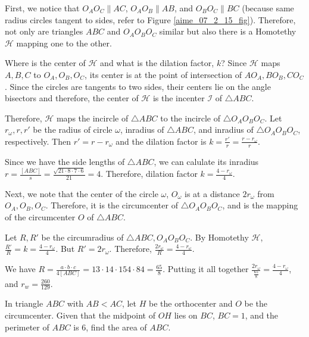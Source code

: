 \documentclass[11pt,twoside]{scrartcl}
\begin{document}
\begin{soln}
    First, we notice that $O_AO_C \parallel AC$, $O_AO_B \parallel AB$, and $O_BO_C \parallel BC$ (because same radius circles tangent to sides, refer to Figure \ref{aime_07_2_15_fig}). Therefore, not only are triangles $ABC$ and $O_AO_BO_C$ similar but also there is a Homotethy $\mathcal{H}$ mapping one to the other. 

    Where is the center of $\mathcal{H}$ and what is the dilation factor, $k$? Since $\mathcal{H}$ maps $A, B, C$ to $O_A, O_B, O_C$, its center is at the point of intersection of $AO_A, BO_B, CO_C$. Since the circles are tangents to two sides, their centers lie on the angle bisectors and therefore, the center of $\mathcal{H}$ is the incenter $\mathcal{I}$ of $\triangle ABC$.

    Therefore, $\mathcal{H}$ maps the incircle of $\triangle ABC$ to the incircle of $\triangle O_AO_BO_C$. Let $r_\omega, r, r'$ be the radius of circle $\omega$, inradius of $\triangle ABC$, and inradius of $\triangle O_AO_BO_C$, respectively. Then $r' = r - r_\omega$ and the dilation factor is $k = \frac{r'}{r} = \frac{r - r_\omega}{r}$.

    Since we have the side lengths of $\triangle{ABC}$, we can calulate its inradius $r = \frac{[ABC]}{s} = \frac{\sqrt{21\cdot8\cdot7\cdot6}}{21} = 4$. Therefore, dilation factor $k = \frac{4-r_\omega}{4}$.

    Next, we note that the center of the circle $\omega$, $O_\omega$ is at a distance $2r_\omega$ from $O_A, O_B, O_C$. Therefore, it is the circumcenter of $\triangle O_AO_BO_C$, and is the mapping of the circumcenter $O$ of $\triangle ABC$.

    Let $R, R'$ be the circumradius of $\triangle ABC, O_AO_BO_C$. By Homotethy $\mathcal{H}$, $\frac{R'}{R} = k = \frac{4-r_\omega}{4}$. But $R' = 2r_\omega$. Therefore, $\frac{2r_\omega}{R} = \frac{4-r_\omega}{4}$.

    We have $R = \frac{a\cdot b\cdot c}{4[ABC]} = {13 \cdot 14 \cdot 15}{4 \cdot 84} = \frac{65}{8}$. Putting it all together $\frac{2r_\omega}{\frac{65}{8}} = \frac{4-r_\omega}{4}$, and $r_w = \boxed{\frac{260}{129}}.$
\end{soln}

\begin{example}\label{hmmt_feb_19_geo_8}
    In triangle $ABC$ with $AB < AC$, let $H$ be the orthocenter and $O$ be the circumcenter. Given that the midpoint of $OH$ lies on $BC$, $BC = 1$, and the perimeter of $ABC$ is 6, find the area of $ABC$.
\end{example}
\end{document}
